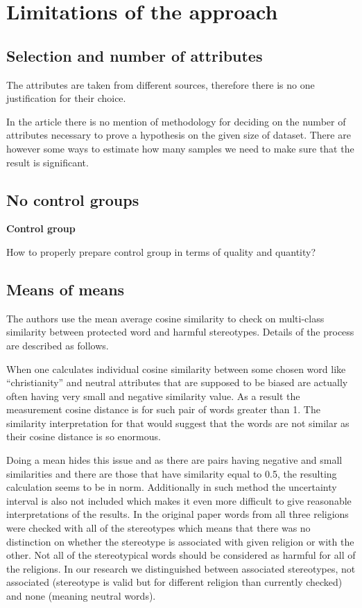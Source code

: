 \documentclass[12pt,]{book}
\begin{document}
\chapter{Limitations of the approach}\label{limitations-of-the-approach}

\section{Selection and number of
attributes}\label{selection-and-number-of-attributes}

The attributes are taken from different sources, therefore there is no
one justification for their choice.

In the article there is no mention of methodology for deciding on the
number of attributes necessary to prove a hypothesis on the given size
of dataset. There are however some ways to estimate how many samples we
need to make sure that the result is significant.

\section{No control groups}\label{no-control-groups}

\textbf{Control group}

How to properly prepare control group in terms of quality and quantity?

\section{Means of means}\label{means-of-means}

The authors use the mean average cosine similarity to check on
multi-class similarity between protected word and harmful stereotypes.
Details of the process are described as follows.

When one calculates individual cosine similarity between some chosen
word like ``christianity'' and neutral attributes that are supposed to
be biased are actually often having very small and negative similarity
value. As a result the measurement cosine distance is for such pair of
words greater than 1. The similarity interpretation for that would
suggest that the words are not similar as their cosine distance is so
enormous.

Doing a mean hides this issue and as there are pairs having negative and
small similarities and there are those that have similarity equal to
0.5, the resulting calculation seems to be in norm. Additionally in such
method the uncertainty interval is also not included which makes it even
more difficult to give reasonable interpretations of the results. In the
original paper words from all three religions were checked with all of
the stereotypes which means that there was no distinction on whether the
stereotype is associated with given religion or with the other. Not all
of the stereotypical words should be considered as harmful for all of
the religions. In our research we distinguished between associated
stereotypes, not associated (stereotype is valid but for different
religion than currently checked) and none (meaning neutral words).
\newline
\end{document}
